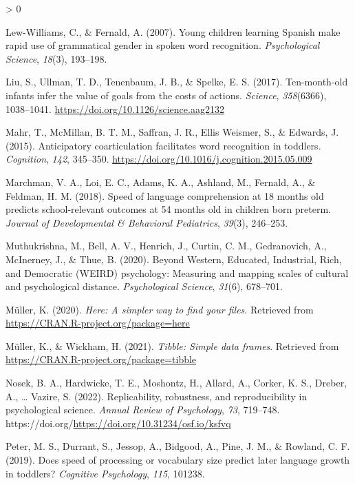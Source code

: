 \documentclass[
  english,
  man,floatsintext]{apa6}
\newlength{\cslhangindent}
\newenvironment{CSLReferences}[2] %
 {%
  \setlength{\parindent}{0pt}
  \ifodd #1 \everypar{\setlength{\hangindent}{\cslhangindent}}\ignorespaces\fi
  \ifnum #2 > 0
  \setlength{\parskip}{#2\baselineskip}
  \fi
 }%
 {}
\begin{document}
\begin{CSLReferences}{1}{0}
\leavevmode\hypertarget{ref-lewwilliams2007}{}%
Lew-Williams, C., \& Fernald, A. (2007). {Young children learning Spanish make rapid use of grammatical gender in spoken word recognition}. \emph{Psychological Science}, \emph{18}(3), 193--198.

\leavevmode\hypertarget{ref-Liu2017}{}%
Liu, S., Ullman, T. D., Tenenbaum, J. B., \& Spelke, E. S. (2017). {Ten-month-old infants infer the value of goals from the costs of actions}. \emph{Science}, \emph{358}(6366), 1038--1041. \url{https://doi.org/10.1126/science.aag2132}

\leavevmode\hypertarget{ref-Mahr2015}{}%
Mahr, T., McMillan, B. T. M., Saffran, J. R., Ellis Weismer, S., \& Edwards, J. (2015). {Anticipatory coarticulation facilitates word recognition in toddlers}. \emph{Cognition}, \emph{142}, 345--350. \url{https://doi.org/10.1016/j.cognition.2015.05.009}

\leavevmode\hypertarget{ref-marchman2018}{}%
Marchman, V. A., Loi, E. C., Adams, K. A., Ashland, M., Fernald, A., \& Feldman, H. M. (2018). {Speed of language comprehension at 18 months old predicts school-relevant outcomes at 54 months old in children born preterm}. \emph{Journal of Developmental {\&} Behavioral Pediatrics}, \emph{39}(3), 246--253.

\leavevmode\hypertarget{ref-muthukrishna2020}{}%
Muthukrishna, M., Bell, A. V., Henrich, J., Curtin, C. M., Gedranovich, A., McInerney, J., \& Thue, B. (2020). {Beyond Western, Educated, Industrial, Rich, and Democratic (WEIRD) psychology: Measuring and mapping scales of cultural and psychological distance}. \emph{Psychological Science}, \emph{31}(6), 678--701.

\leavevmode\hypertarget{ref-R-here}{}%
Müller, K. (2020). \emph{Here: A simpler way to find your files}. Retrieved from \url{https://CRAN.R-project.org/package=here}

\leavevmode\hypertarget{ref-R-tibble}{}%
Müller, K., \& Wickham, H. (2021). \emph{Tibble: Simple data frames}. Retrieved from \url{https://CRAN.R-project.org/package=tibble}

\leavevmode\hypertarget{ref-Nosek2021}{}%
Nosek, B. A., Hardwicke, T. E., Moshontz, H., Allard, A., Corker, K. S., Dreber, A., \ldots{} Vazire, S. (2022). {Replicability, robustness, and reproducibility in psychological science.} \emph{Annual Review of Psychology}, \emph{73}, 719--748. https://doi.org/\url{https://doi.org/10.31234/osf.io/ksfvq}

\leavevmode\hypertarget{ref-peter2019}{}%
Peter, M. S., Durrant, S., Jessop, A., Bidgood, A., Pine, J. M., \& Rowland, C. F. (2019). Does speed of processing or vocabulary size predict later language growth in toddlers? \emph{Cognitive Psychology}, \emph{115}, 101238.


\end{CSLReferences}
\end{document}
